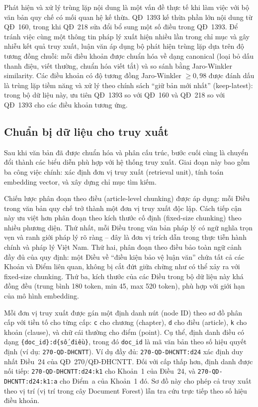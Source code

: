 Phát hiện và xử lý trùng lặp nội dung là một vấn đề thực tế khi làm việc với
bộ văn bản quy chế có mối quan hệ kế thừa. QĐ~1393 kế thừa phần lớn nội dung
từ QĐ~160, trong khi QĐ~218 sửa đổi bổ sung một số điều trong QĐ~1393. Để tránh
việc cùng một thông tin pháp lý xuất hiện nhiều lần trong chỉ mục và gây nhiễu
kết quả truy xuất, luận văn áp dụng bộ phát hiện trùng lặp dựa trên độ tương
đồng chuỗi: mỗi điều khoản được chuẩn hóa về dạng canonical (loại bỏ dấu thanh
điệu, viết thường, chuẩn hóa viết tắt) và so sánh bằng Jaro-Winkler similarity.
Các điều khoản có độ tương đồng Jaro-Winkler $\geq 0{,}98$ được đánh dấu là
trùng lặp tiềm năng và xử lý theo chính sách ``giữ bản mới nhất''
(keep-latest): trong bộ dữ liệu này, ưu tiên QĐ~1393 so với QĐ~160 và QĐ~218
so với QĐ~1393 cho các điều khoản tương ứng.

\subsection{Chuẩn bị dữ liệu cho truy xuất}
\label{subsec:chuan-bi-du-lieu}

Sau khi văn bản đã được chuẩn hóa và phân cấu trúc, bước cuối cùng là chuyển
đổi thành các biểu diễn phù hợp với hệ thống truy xuất. Giai đoạn này bao gồm
ba công việc chính: xác định đơn vị truy xuất (retrieval unit), tính toán
embedding vector, và xây dựng chỉ mục tìm kiếm.

Chiến lược phân đoạn theo điều (article-level chunking) được áp dụng: mỗi Điều
trong văn bản quy chế trở thành một đơn vị truy xuất độc lập. Cách tiếp cận này
ưu việt hơn phân đoạn theo kích thước cố định (fixed-size chunking) \cite{manning2008ir}
theo nhiều phương diện. Thứ nhất, mỗi Điều trong văn bản pháp lý có ngữ nghĩa
trọn vẹn và ranh giới pháp lý rõ ràng -- đây là đơn vị trích dẫn trong thực
tiễn hành chính và pháp lý Việt Nam. Thứ hai, phân đoạn theo điều bảo toàn ngữ
cảnh đầy đủ của quy định: một Điều về ``điều kiện bảo vệ luận văn'' chứa tất
cả các Khoản và Điểm liên quan, không bị cắt đứt giữa chừng như có thể xảy ra
với fixed-size chunking. Thứ ba, kích thước của các Điều trong bộ dữ liệu này
khá đồng đều (trung bình 180 token, min 45, max 520 token), phù hợp với giới
hạn của mô hình embedding.

Mỗi đơn vị truy xuất được gán một định danh nút (node ID) theo sơ đồ phân cấp
với tiền tố cho từng cấp: \texttt{c} cho chương (chapter), \texttt{d} cho điều
(article), \texttt{k} cho khoản (clause), và chữ cái thường cho điểm (point).
Cụ thể, định danh điều có dạng \texttt{\{doc\_id\}:d\{số\_điều\}}, trong đó
\texttt{doc\_id} là mã văn bản theo số hiệu quyết định (ví dụ:
\texttt{270-QD-DHCNTT}). Ví dụ đầy đủ: \texttt{270-QD-DHCNTT:d24} xác định
duy nhất Điều~24 của QĐ~270/QĐ-ĐHCNTT. Đối với cấp thấp hơn, định danh được
nối tiếp: \texttt{270-QD-DHCNTT:d24:k1} cho Khoản~1 của Điều~24, và
\texttt{270-QD-DHCNTT:d24:k1:a} cho Điểm~a của Khoản~1 đó.
Sơ đồ này cho phép cả truy xuất theo vị trí (vị trí trong cây Document
Forest) lẫn tra cứu trực tiếp theo số hiệu điều khoản.

